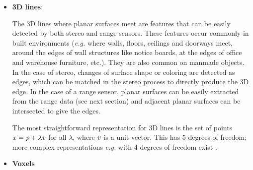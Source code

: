 \documentclass[twocolumn,oneside]{book}
\begin{document}
\begin{itemize}
\item {\bf 3D lines}:
  
  The 3D lines where planar surfaces meet are features that can be
  easily detected by both stereo and range sensors.  These features
  occur commonly in built environments ({\it e.g.} where walls,
  floors, ceilings and doorways meet, around the edges of wall
  structures like notice boards, at the edges of office and warehouse
  furniture, etc.).  They are also common on manmade objects.  In the
  case of stereo, changes of surface shape or coloring are detected as
  edges, which can be matched in the stereo process to directly
  produce the 3D edge.  In the case of a range sensor, planar surfaces
  can be easily extracted from the range data (see next section) and
  adjacent planar surfaces can be intersected to give the edges.

  The most straightforward representation for 3D lines is the set of
  points $ {\bf \it x} = {\bf \it p} + \lambda {\bf \it v}$ for all
  $\lambda$, where ${\bf \it v}$ is a unit vector.  This has 5 degrees
  of freedom; more complex representations {\it e.g.} with 4 degrees
  of freedom exist \cite{hartley}.

\item {\bf Voxels}


\end{itemize}
\end{document}
